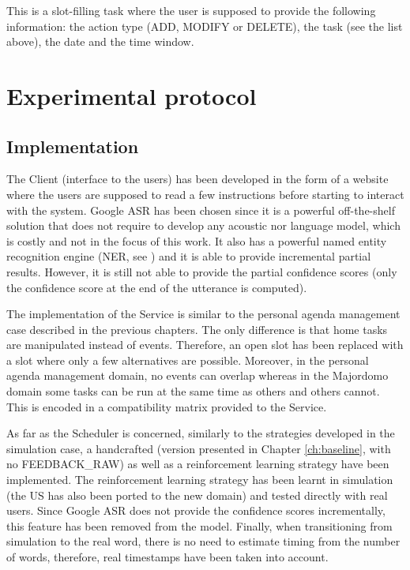 	This is a slot-filling task where the user is supposed to provide the following information: the action type (ADD, MODIFY or DELETE), the task (see the list above), the date and the time window.

\section{Experimental protocol}

	\subsection{Implementation}
	
		The Client (interface to the users) has been developed in the form of a website where the users are supposed to read a few instructions before starting to interact with the system. Google ASR has been chosen since it is a powerful off-the-shelf solution that does not require to develop any acoustic nor language model, which is costly and not in the focus of this work. It also has a powerful named entity recognition engine (NER, see \cite{BenJannet2015}) and it is able to provide incremental partial results. However, it is still not able to provide the partial confidence scores (only the confidence score at the end of the utterance is computed).
		
		The implementation of the Service is similar to the personal agenda management case described in the previous chapters. The only difference is that home tasks are manipulated instead of events. Therefore, an open slot has been replaced with a slot where only a few alternatives are possible. Moreover, in the personal agenda management domain, no events can overlap whereas in the Majordomo domain some tasks can be run at the same time as others and others cannot. This is encoded in a compatibility matrix provided to the Service.
		
		As far as the Scheduler is concerned, similarly to the strategies developed in the simulation case, a handcrafted (version presented in Chapter \ref{ch:baseline}, with no FEEDBACK\_RAW) as well as a reinforcement learning strategy have been implemented. The reinforcement learning strategy has been learnt in simulation (the US has also been ported to the new domain) and tested directly with real users. Since Google ASR does not provide the confidence scores incrementally, this feature has been removed from the model. Finally, when transitioning from simulation to the real word, there is no need to estimate timing from the number of words, therefore, real timestamps have been taken into account.
		

